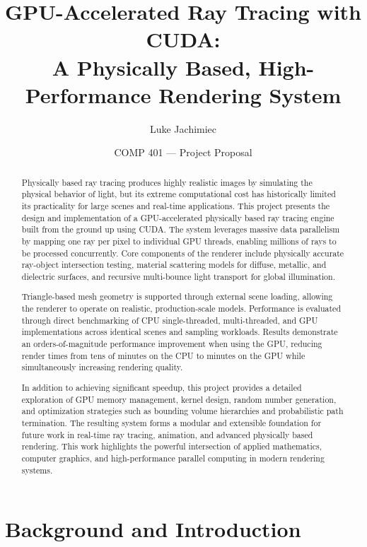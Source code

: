 \documentclass[11pt]{article}
\title{\textbf{GPU-Accelerated Ray Tracing with CUDA:\\
A Physically Based, High-Performance Rendering System}}
\author{Luke Jachimiec}
\date{COMP 401 — Project Proposal}
\begin{document}
\maketitle

\begin{abstract}
Physically based ray tracing produces highly realistic images by simulating the physical behavior of light, but its extreme computational cost has historically limited its practicality for large scenes and real-time applications. This project presents the design and implementation of a GPU-accelerated physically based ray tracing engine built from the ground up using CUDA. The system leverages massive data parallelism by mapping one ray per pixel to individual GPU threads, enabling millions of rays to be processed concurrently. Core components of the renderer include physically accurate ray-object intersection testing, material scattering models for diffuse, metallic, and dielectric surfaces, and recursive multi-bounce light transport for global illumination.

Triangle-based mesh geometry is supported through external scene loading, allowing the renderer to operate on realistic, production-scale models. Performance is evaluated through direct benchmarking of CPU single-threaded, multi-threaded, and GPU implementations across identical scenes and sampling workloads. Results demonstrate an orders-of-magnitude performance improvement when using the GPU, reducing render times from tens of minutes on the CPU to minutes on the GPU while simultaneously increasing rendering quality.

In addition to achieving significant speedup, this project provides a detailed exploration of GPU memory management, kernel design, random number generation, and optimization strategies such as bounding volume hierarchies and probabilistic path termination. The resulting system forms a modular and extensible foundation for future work in real-time ray tracing, animation, and advanced physically based rendering. This work highlights the powerful intersection of applied mathematics, computer graphics, and high-performance parallel computing in modern rendering systems.
\end{abstract}


\section{Background and Introduction}
\end{document}
